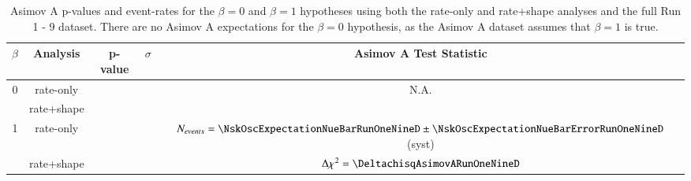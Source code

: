 \begin{table}
	\centering
	\begin{tabular}{|c|c|c|c|c|}
		\hline
		$\beta$				& Analysis		& p-value                		& $\sigma$ 						    & Asimov A Test Statistic\\
		\hline
		\multirow{ 2}{*}{0} & rate-only		& \pvalRateOnlyBetaZeroAsimovARunOneNineD  & \sigmaRateOnlyBetaZeroAsimovARunOneNineD    & \multirow{ 2}{*}{N.A.}    \\
		\cline{2-4}
			   				& rate+shape	& \pvalRateShapeBetaZeroAsimovARunOneNineD & \sigmaRateShapeBetaZeroAsimovARunOneNineD   &    \\
		\hline
		\multirow{ 2}{*}{1} & rate-only		& \pvalRateOnlyBetaOneAsimovARunOneNineD   & \sigmaRateOnlyBetaOneAsimovARunOneNineD     & $N_{events} = \NskOscExpectationNueBarRunOneNineD \pm \NskOscExpectationNueBarErrorRunOneNineD$ (syst) \\
		\cline{2-5}
			   				& rate+shape	& \pvalRateShapeBetaOneAsimovARunOneNineD  & \sigmaRateShapeBetaOneAsimovARunOneNineD    & $\Delta \chi^2 = \DeltachisqAsimovARunOneNineD$ \\
		\hline
	\end{tabular}
	\caption{Asimov A p-values and event-rates for the $\beta = 0$ and $\beta = 1$ hypotheses using both the rate-only and rate+shape analyses and the full Run 1 - 9 dataset. There are no Asimov A expectations for the $\beta = 0$ hypothesis, as the Asimov A dataset assumes that $\beta = 1$ is true.}
	\label{tab:sensitivity_AsimovA_R1-9d}
\end{table}
